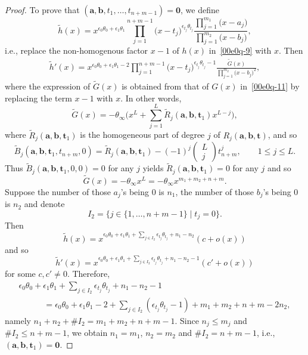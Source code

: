 \documentclass[10pt,a4paper]{amsart}
\numberwithin{equation}{section}
\begin{document}
\begin{proof}
To prove that $(\boldsymbol a, \boldsymbol b, t_1,\dots,t_{n+m-1})=\boldsymbol 0$, we define
\begin{equation*}%
\widetilde{h}(x)=x^{\epsilon_0\theta_0+\epsilon_1\theta_1}\prod_{j=1}^{n+m-1}\bigl(x-t_j\bigr)^{\epsilon_{t_j}\theta_{t_j}}
\frac{\prod_{j=1}^{m_1}\bigl(x-a_j\bigr)}{\prod_{j=1}^{m_2}\bigl(x-b_j\bigr)},
\end{equation*}
i.e., replace the non-homogenous factor $x-1$ of $h(x)$ in~\eqref{00e0q-9} with $x$.
Then
\begin{align*}
\widetilde{h}'(x)=x^{\epsilon_0\theta_0+\epsilon_1\theta_1-2}\prod_{j=1}^{n+m-1}\bigl(x-t_j\bigr)^{\epsilon_{t_j}\theta_{t_j}-1}\frac{\widetilde{G}(x)}{\prod_{j=1}^{m_2}\bigl(x-b_j\bigr)^2},
\end{align*}
where the expression of $\widetilde{G}(x)$ is obtained from that of $G(x)$ in~\eqref{00e0q-11} by replacing the term $x-1$ with $x$. In other words,
\[\widetilde{G}(x)=-\theta_{\infty}\Bigg(x^{L}+\sum_{j=1}^{L}\widetilde{R}_j(\boldsymbol a,\boldsymbol b,\boldsymbol t_1)x^{L-j}\Bigg),\]
where $\widetilde{R}_j(\boldsymbol a,\boldsymbol b,\boldsymbol t_1)$
is the homogeneous part of degree $j$ of $R_j(\boldsymbol
a,\boldsymbol b,\boldsymbol t)$, and so
\[
\widetilde{B}_j(\boldsymbol a,\boldsymbol b,\boldsymbol t_1,t_{n+m},0)=\widetilde{R}_j(\boldsymbol a,\boldsymbol b,\boldsymbol t_1)-(-1)^j
\begin{pmatrix}L\\ j\end{pmatrix}t_{n+m}^j,\qquad 1\leq j\leq L.
\]
Thus $\widetilde{B}_j(\boldsymbol a,\boldsymbol b,\boldsymbol t_1,0,0)=0$ for any $j$ yields $\widetilde{R}_j(\boldsymbol a,\boldsymbol b,\boldsymbol t_1)=0$ for any $j$ and so
\[
\widetilde{G}(x)=-\theta_{\infty}x^{L}=-\theta_\infty x^{m_1+m_2+n+m}.
\]
Suppose the number of those $a_j$'s being $0$ is $n_1$, the number of those $b_j$'s being $0$ is $n_2$ and denote
\[
I_2=\{j\in \{1,\dots, n+m-1\} \mid t_j=0\}.
\]
Then
\[
\widetilde{h}(x)=x^{\epsilon_0\theta_0+\epsilon_1\theta_1+\sum_{j\in I_2}\epsilon_{t_j}\theta_{t_j}+n_1-n_2}(c+o(x))
\]
and so
\[
\widetilde{h}'(x)=x^{\epsilon_0\theta_0+\epsilon_1\theta_1+\sum_{j\in I_2}\epsilon_{t_j}\theta_{t_j}+n_1-n_2-1}(c'+o(x))
\]
for some $c, c'\neq 0$. Therefore,
\begin{gather*}
\epsilon_0\theta_0+\epsilon_1\theta_1+\sum_{j\in I_2}\epsilon_{t_j}\theta_{t_j}+n_1-n_2-1\\
\qquad\quad=\epsilon_0\theta_0+\epsilon_1\theta_1-2+\sum_{j\in I_2}(\epsilon_{t_j}\theta_{t_j}-1)+m_1+m_2+n+m-2n_2,
\end{gather*}
namely $n_1+n_2+\# I_2=m_1+m_2+n+m-1$. Since $n_j\leq m_j$ and $\#I_2\leq n+m-1$, we obtain $n_1=m_1$, $n_2=m_2$ and $\# I_2=n+m-1$, i.e., $(\boldsymbol a, \boldsymbol b, \boldsymbol t_1)=\boldsymbol 0$.


\end{proof}
\end{document}
